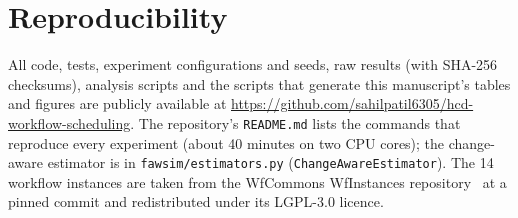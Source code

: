 \documentclass[10pt,twocolumn,letterpaper]{article}
\begin{document}
\section*{Reproducibility}
All code, tests, experiment configurations and seeds, raw results (with SHA-256 checksums), analysis scripts and the scripts
that generate this manuscript's tables and figures are publicly available at
\url{https://github.com/sahilpatil6305/hcd-workflow-scheduling}. The repository's \texttt{README.md} lists the commands that
reproduce every experiment (about 40 minutes on two CPU cores); the change-aware estimator is in
\texttt{fawsim/estimators.py} (\texttt{ChangeAwareEstimator}). The 14 workflow instances are taken from the WfCommons
WfInstances repository~\cite{coleman2022wfcommons} at a pinned commit and redistributed under its LGPL-3.0 licence.
\end{document}

